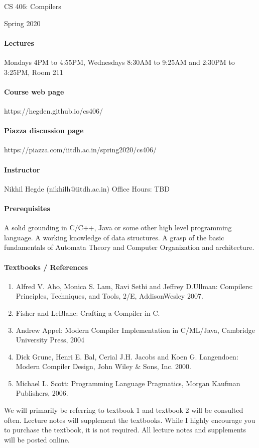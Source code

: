 \documentclass{article}
\begin{document}
\begin{center}{\LARGE CS 406: Compilers} \end{center}
\begin{center}{\large Spring 2020} \end{center}

\bigskip

\paragraph{Lectures}
Mondays 4PM to 4:55PM, Wednesdays 8:30AM to 9:25AM and 2:30PM to 3:25PM, Room 211
\paragraph{Course web page} https://hegden.github.io/cs406/
\paragraph{Piazza discussion page} https://piazza.com/iitdh.ac.in/spring2020/cs406/

\paragraph{Instructor}
Nikhil Hegde (nikhilh@iitdh.ac.in)
Office Hours: TBD

\paragraph{Prerequisites}  A solid grounding in C/C++, Java or some other high level programming language. 
A working knowledge of data structures. 
A grasp of the basic fundamentals of Automata Theory and Computer Organization and architecture. 

\paragraph{Textbooks / References} 
\begin{enumerate}
	\item Alfred V. Aho, Monica S. Lam, Ravi Sethi and Jeffrey D.Ullman: Compilers: Principles, Techniques, and Tools, 2/E, AddisonWesley 2007.
	\item Fisher and LeBlanc: Crafting a Compiler in C. 
	\item Andrew Appel: Modern Compiler Implementation in C/ML/Java, Cambridge University Press, 2004
	\item Dick Grune, Henri E. Bal, Cerial J.H. Jacobs and Koen G. Langendoen: Modern Compiler Design, John Wiley \& Sons, Inc. 2000.
	\item Michael L. Scott: Programming Language Pragmatics, Morgan Kaufman Publishers, 2006.
\end{enumerate}
We will primarily be referring to textbook 1 and textbook 2 will be consulted often. Lecture notes will supplement the textbooks. 
While I highly encourage you to purchase the textbook, it is not required.
All lecture notes and supplements will be posted online.  
\end{document}
